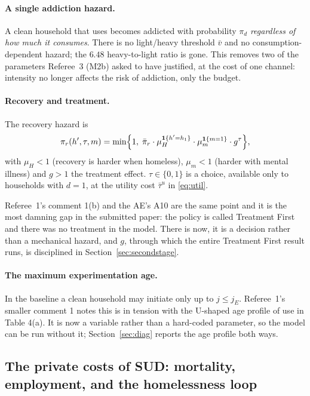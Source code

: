 \documentclass[11pt]{article}
\newcommand{\ind}[1]{\mathbf{1}\{#1\}}
\begin{document}
\paragraph{A single addiction hazard.} A clean household that uses becomes
addicted with probability $\pi_d$ \emph{regardless of how much it consumes}.
There is no light/heavy threshold $\bar v$ and no consumption-dependent hazard;
the $6.48$ heavy-to-light ratio is gone. This removes two of the parameters
Referee~3 (M2b) asked to have justified, at the cost of one channel: intensity no
longer affects the risk of addiction, only the budget.

\paragraph{Recovery and treatment.} The recovery hazard is
\begin{equation}
\pi_r(h',\tau,m)=\min\Bigl\{1,\;\bar\pi_r\cdot\mu_H^{\ind{h'=h_1}}\cdot\mu_m^{\ind{m=1}}\cdot g^{\tau}\Bigr\},
\label{eq:recover}
\end{equation}
with $\mu_H<1$ (recovery is harder when homeless), $\mu_m<1$ (harder with mental
illness) and $g>1$ the treatment effect. $\tau\in\{0,1\}$ is a choice, available
only to households with $d=1$, at the utility cost $\bar\tau^u$ in
\eqref{eq:util}.

Referee~1's comment 1(b) and the AE's A10 are the same point and it is the most
damning gap in the submitted paper: the policy is called Treatment First and
there was no treatment in the model. There is now, it is a decision rather than a
mechanical hazard, and $g$, through which the entire Treatment First result
runs, is disciplined in Section~\ref{sec:secondstage}.

\paragraph{The maximum experimentation age.} In the baseline a clean household
may initiate only up to $j\le j_{E}$. Referee~1's smaller comment 1 notes this is
in tension with the U-shaped age profile of use in Table 4(a). It is now a
variable rather than a hard-coded parameter, so the model can be run without it;
Section~\ref{sec:diag} reports the age profile both ways.

\subsection{The private costs of SUD: mortality, employment, and the homelessness loop}
\label{sec:costs}
\end{document}
